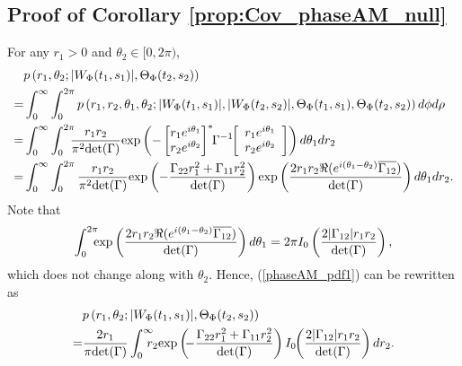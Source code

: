 \documentclass{amsart}
\begin{document}
\subsection{Proof of Corollary \ref{prop:Cov_phaseAM_null}}\label{sec:proof:prop:Cov_phaseAM_null}
For any $r_{1}>0$ and $\theta_{2}\in[0,2\pi)$,
\begin{align}\label{phaseAM_pdf1}
&p\left(r_{1},\theta_{2};
|W_{\Phi}(t_{1},s_{1})|,\Theta_{\Phi}(t_{2},s_{2})\right)
\\\notag=&\int_{0}^{\infty}\int_{0}^{2\pi}p\left(r_{1},r_{2},\theta_{1},\theta_{2};
|W_{\Phi}(t_{1},s_{1})|,|W_{\Phi}(t_{2},s_{2})|,
\Theta_{\Phi}(t_{1},s_{1}),\Theta_{\Phi}(t_{2},s_{2})\right)
d\phi d\rho
\\\notag
=&\int_{0}^{\infty}\int_{0}^{2\pi}\hspace{-0.2cm}
\frac{r_{1}r_{2}}{\pi^2\textup{det}(\Gamma)}
\textup{exp}\left(-\begin{bmatrix}r_{1}e^{i\theta_{1}} \\ r_{2} e^{i\theta_{2}} \end{bmatrix}^{*}\hspace{-0.1cm}\Gamma^{-1}\hspace{-0.1cm}\left[\begin{array}{cc}r_{1}e^{i\theta_{1}}\\ r_{2}e^{i\theta_{2}}\end{array}\right]\right)
d\theta_1  dr_2
\\\notag=&
\int_{0}^{\infty}\int_{0}^{2\pi}\frac{r_{1}r_{2}}{\pi^2\textup{det}(\Gamma)}
\textup{exp}\left(-\frac{\Gamma_{22}r_{1}^2+\Gamma_{11}r_{2}^{2}}
{\textup{det}(\Gamma)}\right)
\textup{exp}\left(\frac{2r_{1}r_{2}\Re(e^{i(\theta_{1}-\theta_{2})}
\overline{\Gamma_{12}})}{\textup{det}(\Gamma)}\right)
 d\theta_1  dr_2.
\end{align}
Note that
\begin{align*}
\int_{0}^{2\pi}\hspace{-0.2cm}\textup{exp}\left(\frac{2r_{1}r_{2}\Re(e^{i(\theta_{1}-\theta_{2})}
\overline{\Gamma_{12}})}{\textup{det}(\Gamma)}\right)  d\theta_1
=2\pi I_{0}\left(\frac{2|\Gamma_{12}|r_{1}r_{2}}{\textup{det}(\Gamma)}\right),
\end{align*}
which does not change along with $\theta_{2}$.
Hence, (\ref{phaseAM_pdf1}) can be rewritten as
\begin{align}\notag%
&p\left(r_{1},\theta_{2};
|W_{\Phi}(t_{1},s_{1})|,\Theta_{\Phi}(t_{2},s_{2})\right)
\\\notag=&\frac{2r_{1}}{\pi\textup{det}(\Gamma)}
\int_{0}^{\infty}\hspace{-0.25cm}r_{2}
\textup{exp}\left(\hspace{-0.1cm}-\frac{\Gamma_{22}r_{1}^2+\Gamma_{11}r_{2}^{2}}{\textup{det}(\Gamma)}\right)
I_{0}\hspace{-0.1cm}\left(\frac{2|\Gamma_{12}|r_{1}r_{2}}{\textup{det}(\Gamma)}\right)dr_2.
\end{align}
\end{document}
